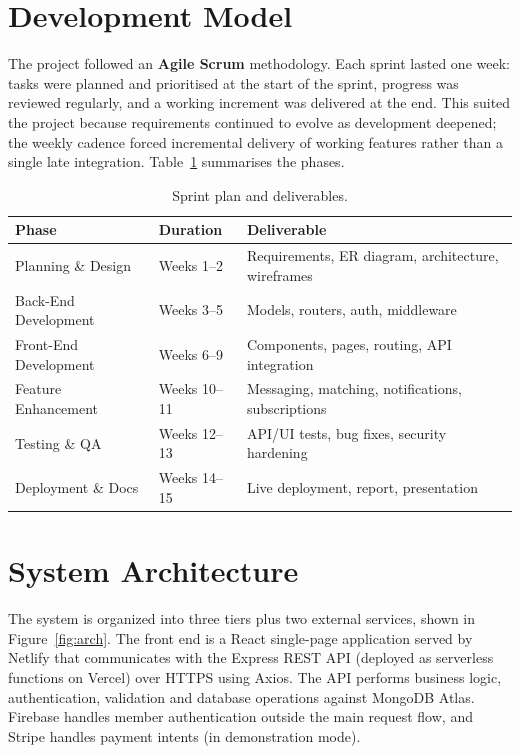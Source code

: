 \documentclass[12pt,a4paper]{report}
\begin{document}
\section{Development Model}
The project followed an \textbf{Agile Scrum} methodology. Each sprint lasted one
week: tasks were planned and prioritised at the start of the sprint, progress
was reviewed regularly, and a working increment was delivered at the end. This
suited the project because requirements continued to evolve as development
deepened; the weekly cadence forced incremental delivery of working features
rather than a single late integration. Table~\ref{tab:sprints} summarises the
phases.

\begin{table}[H]
\centering
\caption{Sprint plan and deliverables.}
\label{tab:sprints}
\small
\begin{tabularx}{\textwidth}{l l X}
\toprule
\textbf{Phase} & \textbf{Duration} & \textbf{Deliverable} \\
\midrule
Planning \& Design      & Weeks 1--2   & Requirements, ER diagram, architecture, wireframes \\
Back-End Development    & Weeks 3--5   & Models, routers, auth, middleware \\
Front-End Development   & Weeks 6--9   & Components, pages, routing, API integration \\
Feature Enhancement     & Weeks 10--11 & Messaging, matching, notifications, subscriptions \\
Testing \& QA           & Weeks 12--13 & API/UI tests, bug fixes, security hardening \\
Deployment \& Docs      & Weeks 14--15 & Live deployment, report, presentation \\
\bottomrule
\end{tabularx}
\end{table}

\section{System Architecture}
The system is organized into three tiers plus two external services, shown in
Figure~\ref{fig:arch}. The front end is a React single-page application served
by Netlify that communicates with the Express REST API (deployed as serverless
functions on Vercel) over HTTPS using Axios. The API performs business logic,
authentication, validation and database operations against MongoDB Atlas.
Firebase handles member authentication outside the main request flow, and
Stripe handles payment intents (in demonstration mode).
\end{document}
